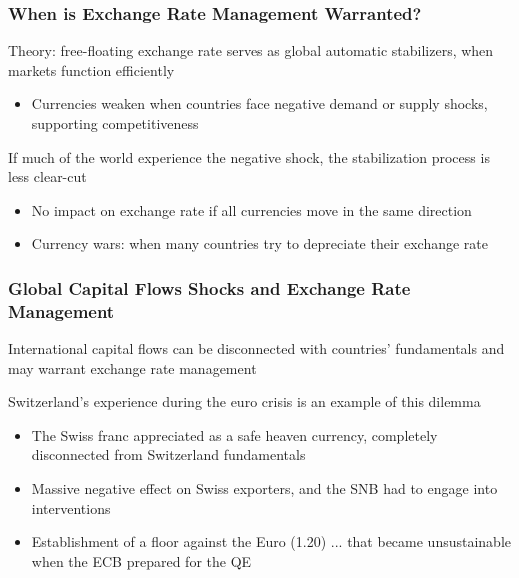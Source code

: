 \documentclass{beamer}
\newenvironment{wideitemize}{\itemize\addtolength{\itemsep}{10pt}}{\enditemize}
\begin{document}
\begin{frame}
  \frametitle{When is Exchange Rate Management Warranted?}
  \begin{wideitemize}
    \item Theory: free-floating exchange rate serves as global automatic stabilizers, when markets function efficiently
      \begin{itemize}
      \item Currencies weaken when countries face negative demand or supply shocks, supporting competitiveness
      \end{itemize}
  \item If much of the world experience the negative shock, the stabilization process is less clear-cut
    \begin{itemize}
    \item No impact on exchange rate if all currencies move in the same direction
    \item Currency wars: when many countries try to depreciate their exchange rate
    \end{itemize}
  \end{wideitemize}
\end{frame}


\begin{frame}
  \frametitle{Global Capital Flows Shocks and Exchange Rate Management}

  \begin{wideitemize}
  \item International capital flows can be disconnected with countries' fundamentals and may warrant exchange rate management
  \item Switzerland's experience during the euro crisis is an example of this dilemma
    \begin{itemize}
    \item The Swiss franc appreciated as a safe heaven currency, completely disconnected from Switzerland fundamentals
    \item Massive negative effect on Swiss exporters, and the SNB had to engage into interventions
    \item Establishment of a floor against the Euro (1.20) ... that became unsustainable when the ECB prepared for the QE
    \end{itemize}
  \end{wideitemize}
  
\end{frame}
\end{document}
